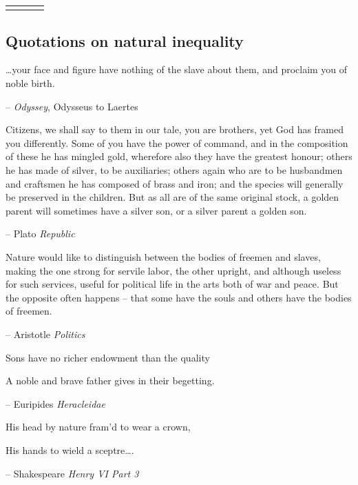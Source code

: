 \documentclass[
]{article}
\theoremstyle{definition}
\theoremstyle{definition}
\theoremstyle{definition}
\theoremstyle{definition}
\theoremstyle{remark}
\begin{document}
\begin{table}[ht]
\begin{centerbox}
\begin{threeparttable}
\begin{tabularx}{0.8\textwidth}{p{} p{} p{} p{}}
\hhline{}
\arrayrulecolor{black}
\end{tabularx}
\end{threeparttable}\par\end{centerbox}

\end{table}
 

\FloatBarrier

\clearpage

\hypertarget{quotations-on-natural-inequality}{%
\subsection{Quotations on natural inequality}\label{quotations-on-natural-inequality}}

\ldots your face and figure have nothing of the slave about them, and
proclaim you of noble birth.

-- \emph{Odyssey}, Odysseus to Laertes

Citizens, we shall say to them in our tale, you are brothers, yet God
has framed you differently. Some of you have the power of command, and
in the composition of these he has mingled gold, wherefore also they
have the greatest honour; others he has made of silver, to be
auxiliaries; others again who are to be husbandmen and craftsmen he has
composed of brass and iron; and the species will generally be preserved
in the children. But as all are of the same original stock, a golden
parent will sometimes have a silver son, or a silver parent a golden
son.

-- Plato \emph{Republic}

Nature would like to distinguish between the bodies of freemen and
slaves, making the one strong for servile labor, the other upright, and
although useless for such services, useful for political life in the
arts both of war and peace. But the opposite often happens -- that some
have the souls and others have the bodies of freemen.

-- Aristotle \emph{Politics}

Sons have no richer endowment than the quality

A noble and brave father gives in their begetting.

-- Euripides \emph{Heracleidae}

His head by nature fram'd to wear a crown,

His hands to wield a sceptre\ldots.

-- Shakespeare \emph{Henry VI Part 3}
\end{document}
